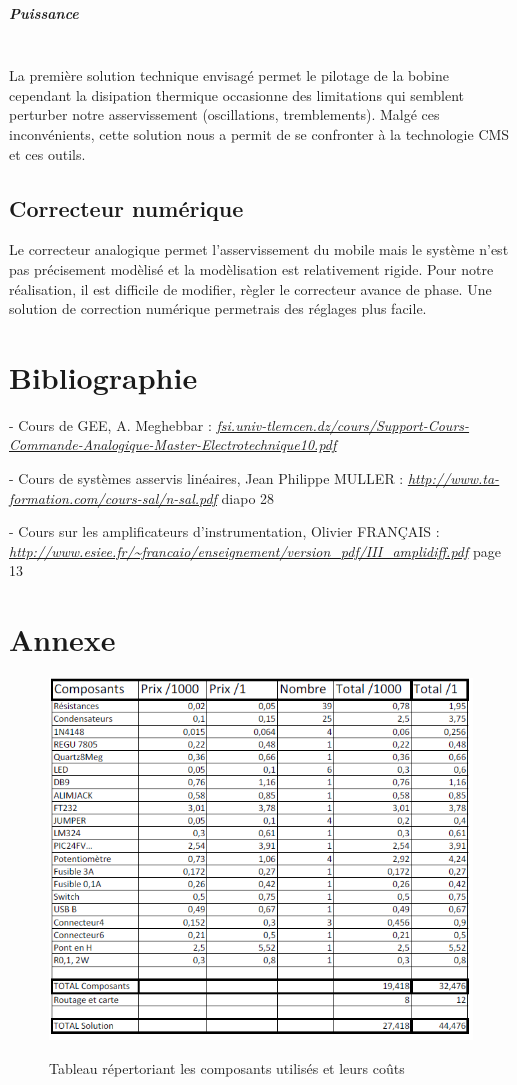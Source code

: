 \documentclass[11pt, french]{article} %
\begin{document}
\subparagraph{Puissance}~\\
La première solution technique envisagé permet le pilotage de la bobine cependant la disipation thermique occasionne des limitations qui semblent perturber notre asservissement (oscillations, tremblements). Malgé ces inconvénients, cette solution nous a permit de se confronter à la technologie CMS et ces outils.

\subsection{Correcteur numérique}
Le correcteur analogique permet l'asservissement du mobile mais le système n'est pas précisement modèlisé et la modèlisation est relativement rigide. Pour notre réalisation, il est difficile de modifier, règler le correcteur avance de phase.
Une solution de correction numérique permetrais des réglages plus facile.
 



\pagebreak
\section{Bibliographie}
\medskip
- Cours de GEE, A. Meghebbar :
\newline \textit{\underline{\url{fsi.univ-tlemcen.dz/cours/Support-Cours-Commande-Analogique-Master-Electrotechnique10.pdf}}} 

- Cours de systèmes asservis linéaires, Jean Philippe MULLER : 
\newline \textit{\underline{\url{http://www.ta-formation.com/cours-sal/n-sal.pdf}}} diapo 28

- Cours sur les amplificateurs d'instrumentation, Olivier FRANÇAIS : 
\newline \textit{\underline{\url{http://www.esiee.fr/~francaio/enseignement/version_pdf/III_amplidiff.pdf}}} page 13


\pagebreak
\section{Annexe}
\medskip
\begin{figure}[!h]
	\centering
	\includegraphics[width=15cm]{SolutionAnalogique/cout.png}
	\label{cout}
	\caption{Tableau répertoriant les composants utilisés et leurs coûts}
\end{figure}
\end{document}
